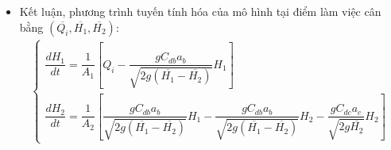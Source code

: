 \documentclass[12pt,a4paper]{article}
\begin{document}
\begin{enumerate}[\it a.]
\begin{itemize}
                    \item Kết luận, phương trình tuyến tính hóa của mô hình tại điểm làm việc cân bằng $\left({ \overline{Q_i}, \overline{H_1}, \overline{H_2}}\right)$:
                        \begin{align}
                            \left\{
                            \begin{array}{l}
                                \dfrac{dH_1}{dt} = \dfrac{1}{A_1} \left[{Q_i - \dfrac{gC_{db}a_b}{\sqrt{2g(\overline{H_1} - \overline{H_2})}} H_1}\right]\\ [.5cm]
                                \dfrac{dH_2}{dt} = \dfrac{1}{A_2} \left[{\dfrac{g C_{db}a_b}{\sqrt{2g(\overline{H_1} - \overline{H_2})}} H_1 - \dfrac{g C_{db}a_b}{ \sqrt{2g(\overline{H_1} - \overline{H_2})}} H_2 - \dfrac{g C_{dc}a_c}{\sqrt{2g\overline{H_2}}} H_2 }\right]
                            \end{array}
                            \right.
                        \end{align}
                \end{itemize}


\end{enumerate}
\end{document}
